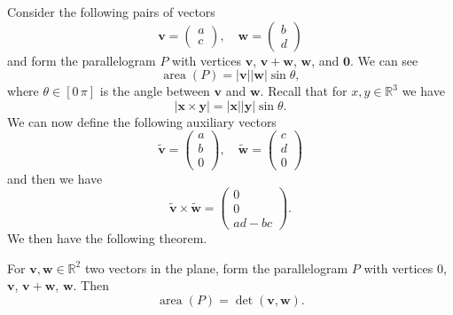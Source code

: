 Consider the following pairs of vectors
\[
    \bm v=
    \begin{pmatrix}
        a\\c
    \end{pmatrix},\quad
    \bm w=
    \begin{pmatrix}
        b\\d
    \end{pmatrix}
\]
and form the parallelogram $P$ with vertices $\bm v$, $\bm v+\bm w$, $\bm w$, and $\bm 0$. We can see \[\operatorname{area}(P)=|\bm v||\bm w|\sin{\theta},\] where $\theta\in[0\,\pi]$ is the angle between $\bm v$ and $\bm w$. Recall that for $x,y\in\mathbb R^3$ we have \[|\bm x\times\bm y|=|\bm x||\bm y|\sin{\theta}.\] We can now define the following auxiliary vectors 
\[
    \bm{\tilde v}=
    \begin{pmatrix}
        a\\b\\0
    \end{pmatrix}
    ,\quad\bm{\tilde w}=
    \begin{pmatrix}
        c\\d\\0
    \end{pmatrix}
\]
and then we have 
\[
    \bm{\tilde v}\times\bm{\tilde w}=
    \begin{pmatrix}
        0\\0\\ad-bc
    \end{pmatrix}
    .
\]
We then have the following theorem.

\begin{theorem}
    For $\bm v,\bm w\in\mathbb R^2$ two vectors in the plane, form the parallelogram $P$ with vertices $0$, $\bm v$, $\bm v+\bm w$, $\bm w$. Then \[\operatorname{area}(P)=\det{(\bm v,\bm w)}.\]
\end{theorem}

